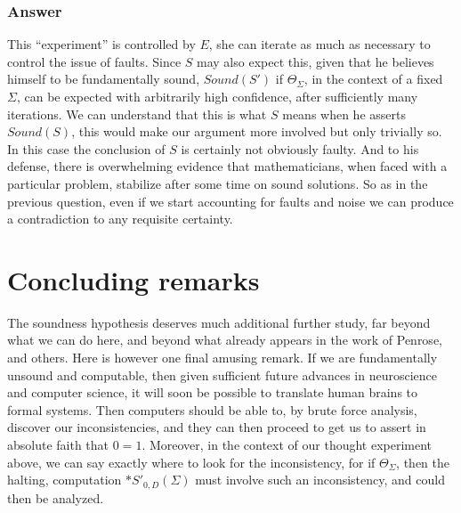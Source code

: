 \documentclass[9pt,twocolumn,twoside,lineno]{pnas-new}
\numberwithin{equation}{section}
\theoremstyle{definition}
\theoremstyle{remark}
\newtheorem{question}{Question}
\begin{document}
\subsubsection* {Answer}
    This ``experiment'' is controlled by $E$, she can iterate as much as necessary to control the issue of faults.  Since $S$ may also expect this, given that he believes himself to be fundamentally sound, $Sound (S')$ if $\Theta _{\Sigma} $, in the context of a fixed $\Sigma$, can be expected with arbitrarily high confidence, after sufficiently many iterations. We can understand that this is  what $S$ means when he asserts $Sound (S)$, this would make our argument more involved but only trivially so. In this case the conclusion of $S$ is certainly not obviously faulty. And to his defense, there is  overwhelming evidence that mathematicians, when faced with a particular problem, stabilize after some time on sound solutions.  So as in the previous question, even if we start accounting for faults and noise we can produce a contradiction to any requisite certainty.  
 \section{Concluding remarks} 
The soundness hypothesis deserves much additional further study, far beyond what we can do here, and beyond what already appears in the work of Penrose, and others. Here is however one final amusing remark.  If we are fundamentally unsound and computable, then given sufficient future advances in neuroscience and computer science, it will soon be possible to translate human brains to formal systems.
Then computers should be able to, by brute force analysis, discover our inconsistencies, and they can then proceed to get us to assert in absolute faith that $0=1$. Moreover, in the context of our thought experiment above, we can say exactly where to look for the inconsistency, for if $\Theta _{\Sigma} $, then the halting, computation $*S' _{0,D} (\Sigma) $ must involve such an inconsistency, and could then be analyzed.
\end{document}
